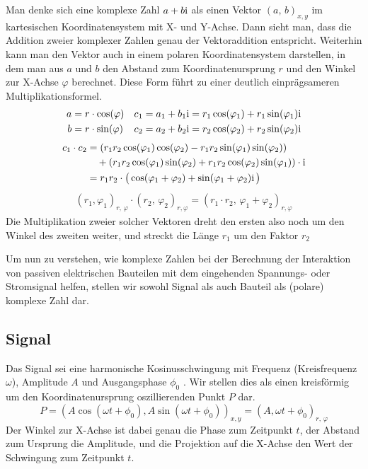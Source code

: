 Man denke sich eine komplexe Zahl $a +b\mathrm{i}$ als einen Vektor $(a,\,b)_{x,y}$ im kartesischen Koordinatensystem mit X- und Y-Achse.
Dann sieht man, dass die Addition zweier komplexer Zahlen genau der Vektoraddition entspricht.
Weiterhin kann man den Vektor auch in einem polaren Koordinatensystem darstellen, in dem man aus $a$ und $b$ den 
Abstand zum Koordinatenursprung $r$ und den Winkel zur X-Achse $\varphi$ berechnet. Diese Form führt zu einer deutlich einprägsameren Multiplikationsformel.  
\begin{align*}
    a&=r \cdot \cos(\varphi) & c_1 &= a_1+b_1\mathrm{i} = r_1\cos(\varphi_1) + r_1\sin(\varphi_1)\mathrm{i}  \\
    b&=r \cdot \sin(\varphi) & c_2 &= a_2+b_2\mathrm{i} = r_2\cos(\varphi_2) + r_2\sin(\varphi_2)\mathrm{i}
\end{align*} \vspace*{-5mm}
\begin{align*}
    c_1 \cdot c_2 &= (r_1r_2\cos(\varphi_1)\cos(\varphi_2) - r_1r_2\sin(\varphi_1)\sin(\varphi_2)) \\
    &\quad + (r_1r_2\cos(\varphi_1)\sin(\varphi_2) + r_1r_2\cos(\varphi_2)\sin(\varphi_1)) \cdot \mathrm{i}\\
    &= r_1r_2 \cdot \big(\cos(\varphi_1 + \varphi_2) + \sin(\varphi_1 + \varphi_2)\mathrm{i}\, \big)
\end{align*} \vspace*{-5mm}
\begin{align*}
    (r_1,\varphi_1)_{r,\,\varphi} \cdot (r_2,\,\varphi_2)_{r,\varphi} = (r_1 \cdot r_2,\, \varphi_1 + \varphi_2)_{r,\varphi}
\end{align*}
Die Multiplikation zweier solcher Vektoren dreht den ersten also noch um den Winkel des zweiten weiter, und streckt die Länge $r_1$ um den Faktor $r_2$

Um nun zu verstehen, wie komplexe Zahlen 
bei der Berechnung der Interaktion von passiven elektrischen Bauteilen mit dem eingehenden Spannungs- oder Stromsignal helfen, stellen wir sowohl Signal als auch Bauteil als (polare) komplexe Zahl dar.

\subsection{Signal}
Das Signal sei eine harmonische Kosinusschwingung mit Frequenz (Kreisfrequenz $\omega$), Amplitude $A$ und Ausgangsphase $\phi_0$ .
Wir stellen dies als einen kreisförmig um den Koordinatenursprung oszillierenden Punkt $P$ dar.
$$P = (A \cos(\omega t + \phi_0), A \sin(\omega t + \phi_0))_{x,y} = (A,\omega t + \phi_0)_{r,\,\varphi}$$
Der Winkel zur X-Achse ist dabei genau die Phase zum Zeitpunkt $t$, der Abstand zum Ursprung die Amplitude, und die Projektion auf die X-Achse den Wert der Schwingung zum Zeitpunkt $t$.

